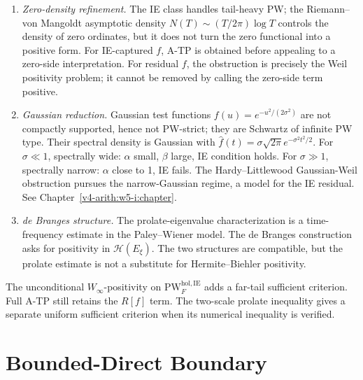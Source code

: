 \begin{remark}
\label{v4-arith:w7-e:rem:construction-interactions}
\begin{enumerate}
\item \emph{Zero-density refinement.} The IE class handles tail-heavy
PW; the Riemann--von Mangoldt asymptotic density
\(N(T)\sim(T/2\pi)\log T\) controls the density of zero ordinates, but
it does not turn the zero functional into a positive form. For
IE-captured \(f\), A-TP is obtained before appealing to a zero-side
interpretation. For residual \(f\), the obstruction is precisely the
Weil positivity problem; it cannot be removed by calling the
zero-side term positive.
\item \emph{Gaussian reduction.} Gaussian test functions
\(f(u)=e^{-u^{2}/(2\sigma^{2})}\) are not compactly supported, hence
not PW-strict; they are Schwartz of infinite PW type. Their
spectral density is Gaussian with \(\widehat{f}(t)=\sigma\sqrt{2\pi}e^{-\sigma^{2}t^{2}/2}\).
For \(\sigma\ll 1\), spectrally wide: \(\alpha\) small, \(\beta\) large,
IE condition holds. For \(\sigma\gg 1\), spectrally narrow:
\(\alpha\) close to 1, IE fails. The Hardy--Littlewood Gaussian-Weil
obstruction pursues the narrow-Gaussian regime, a model for the IE
residual. See
Chapter~\ref{v4-arith:w5-i:chapter}.
\item \emph{de Branges structure.} The prolate-eigenvalue
characterization 
is a time-frequency estimate in the Paley--Wiener model. The de
Branges construction asks for positivity in \(\mathcal{H}(E_{\xi})\). The two
structures are compatible, but the prolate estimate is not a
substitute for Hermite--Biehler positivity.
\end{enumerate}
The unconditional \(W_{\infty}\)-positivity on
\(\mathrm{PW}^{\mathrm{hol},\mathrm{IE}}_{F}\) adds a far-tail
sufficient criterion. Full A-TP still retains the \(R[f]\) term. The
two-scale prolate inequality gives a separate uniform sufficient
criterion when its numerical inequality is verified.
\end{remark}

\section{Bounded-Direct Boundary}
\label{v4-arith:w7-e:summary}

